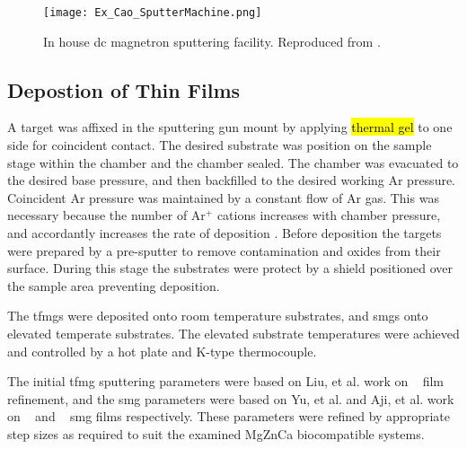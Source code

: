 \documentclass[a4paper,12pt,oneside]{report}%
\begin{document}
\begin{figure}[htbp]
	\centering
	\texttt{[image: Ex\_Cao\_SputterMachine.png]}
	\caption[In house \acrshort{dc} magnetron sputtering facility.]{In house \acrshort{dc} magnetron sputtering facility. Reproduced from \cite{Cao2013}.}
	\label{fig:CaoSputtering}
\end{figure}

\subsection{Depostion of Thin Films}
A target was affixed in the sputtering gun mount by applying \hl{thermal gel} to one side for coincident contact. The desired substrate was position on the sample stage within the chamber and the chamber sealed. The chamber was evacuated to the desired base pressure, and then backfilled to the desired working Ar pressure. Coincident Ar pressure was maintained by a constant flow of Ar gas. This was necessary because the number of Ar$^{+}$ cations increases with chamber pressure, and accordantly increases the rate of deposition \cite{Ozeki2002}. Before deposition the targets were prepared by a pre-sputter to remove contamination and oxides from their surface. During this stage the substrates were protect by a shield positioned over the sample area preventing deposition.

The \glspl{tfmg} were deposited onto room temperature substrates, and \glspl{smg} onto elevated temperate substrates. The elevated substrate temperatures were achieved and controlled by a hot plate and K-type thermocouple.

The initial \gls{tfmg} sputtering parameters were based on Liu, et al. \cite{Liu2012} work on \ZrCuNiAl~ film refinement, and the \gls{smg} parameters were based on Yu, et al. \cite{Yu2013} and Aji, et al. \cite{Aji2013} work on \ZrCuAl~ and \ZrCuNiAl~ \gls{smg} films respectively. These parameters were refined by appropriate step sizes as required to suit the examined MgZnCa biocompatible systems. 
\end{document}
